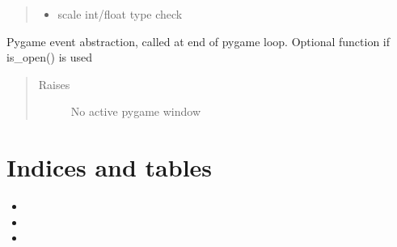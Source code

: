 \documentclass[letterpaper,10pt,english]{sphinxmanual}
\begin{document}
\begin{fulllineitems}
\begin{fulllineitems}
\begin{quote}
\begin{description}
\begin{itemize}
\item {} 
\sphinxAtStartPar
{} \textendash{} scale int/float type check

\end{itemize}

\end{description}\end{quote}

\end{fulllineitems}


\begin{fulllineitems}
\label{\detokenize{dpav:dpav.Window.update}}
\pysigstartsignatures
{}
\pysigstopsignatures
\sphinxAtStartPar
Pygame event abstraction, called at end of pygame loop.
Optional function if is\_open() is used
\begin{quote}\begin{description}
\item[{Raises}] \leavevmode
\sphinxAtStartPar
{} \textendash{} No active pygame window

\end{description}\end{quote}

\end{fulllineitems}


\end{fulllineitems}



\chapter{Indices and tables}
\label{\detokenize{index:indices-and-tables}}\begin{itemize}
\item {} 
\sphinxAtStartPar
{}

\item {} 
\sphinxAtStartPar
{}

\item {} 
\sphinxAtStartPar
{}

\end{itemize}
\end{document}
